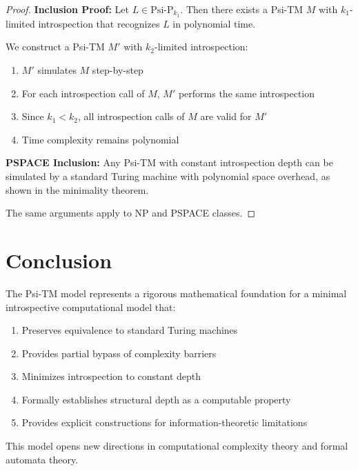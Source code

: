\begin{proof}
\textbf{Inclusion Proof:}
Let $L \in \text{Psi-P}_{k_1}$. Then there exists a Psi-TM $M$ with $k_1$-limited introspection that recognizes $L$ in polynomial time.

We construct a Psi-TM $M'$ with $k_2$-limited introspection:
\begin{enumerate}
\item $M'$ simulates $M$ step-by-step
\item For each introspection call of $M$, $M'$ performs the same introspection
\item Since $k_1 < k_2$, all introspection calls of $M$ are valid for $M'$
\item Time complexity remains polynomial
\end{enumerate}

\textbf{PSPACE Inclusion:}
Any Psi-TM with constant introspection depth can be simulated by a standard Turing machine with polynomial space overhead, as shown in the minimality theorem.

The same arguments apply to NP and PSPACE classes.
\end{proof}

\section{Conclusion}

The Psi-TM model represents a rigorous mathematical foundation for a minimal introspective computational model that:

\begin{enumerate}
\item Preserves equivalence to standard Turing machines
\item Provides partial bypass of complexity barriers
\item Minimizes introspection to constant depth
\item Formally establishes structural depth as a computable property
\item Provides explicit constructions for information-theoretic limitations
\end{enumerate}

This model opens new directions in computational complexity theory and formal automata theory.

